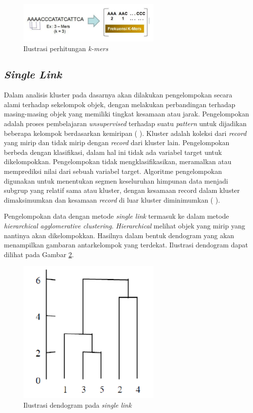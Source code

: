 \begin{figure}[h!]\centering %
	\includegraphics[width=200pt]{mers.png}
	\caption{Ilustrasi perhitungan \textit{k-mers}}
	\label{fig:mers}
\end{figure}

\subsection*{\textit{Single Link}}
Dalam analisis kluster pada dasarnya akan dilakukan pengelompokan secara alami terhadap sekelompok objek, dengan melakukan perbandingan terhadap masing-masing objek yang memiliki tingkat kesamaan atau jarak. Pengelompokan adalah proses pembelajaran \textit{unsupervised} terhadap suatu \textit{pattern} untuk dijadikan beberapa kelompok berdasarkan kemiripan (\citeauthor{JAIN1999} \cite*{JAIN1999}). Kluster adalah koleksi dari \textit{record} yang mirip dan tidak mirip dengan \textit{record} dari kluster lain. Pengelompokan  berbeda dengan klasifikasi, dalam hal ini tidak ada variabel target untuk dikelompokkan. Pengelompokan tidak mengklasifikasikan, meramalkan atau memprediksi nilai dari sebuah variabel target. Algoritme pengelompokan digunakan untuk menentukan segmen keseluruhan himpunan data menjadi subgrup yang relatif sama atau kluster, dengan kesamaan record dalam kluster dimaksimumkan dan kesamaan \textit{record} di luar kluster diminimumkan (\citeauthor{LAROSE2005} \cite*{LAROSE2005}).

Pengelompokan data dengan metode \textit{single link} termasuk ke dalam metode \textit{hierarchical agglomerative clustering}. \textit{Hierarchical} melihat objek yang mirip yang nantinya akan dikelompokkan. Hasilnya dalam bentuk dendogram yang akan menampilkan gambaran antarkelompok yang terdekat. Ilustrasi dendogram dapat dilihat pada Gambar \ref{fig:dendogram}.

\begin{figure}[h!] %
	\centering
	\includegraphics[width=200pt]{den.png}
	\caption{Ilustrasi dendogram pada \textit{single link}}
	\label{fig:dendogram}
\end{figure}

